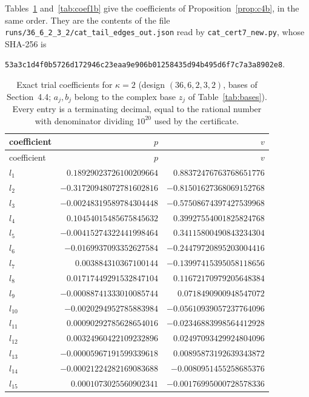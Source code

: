 \documentclass[11pt]{article}
\theoremstyle{definition}
\begin{document}
\clearpage
Tables~\ref{tab:coef2b} and~\ref{tab:coef1b} give the coefficients of Proposition~\ref{prop:c4b}, in the same order. They are the contents of the file \texttt{runs/36\_6\_2\_3\_2/cat\_tail\_edges\_out.json} read by \texttt{cat\_cert7\_new.py}, whose SHA-256 is
\begin{center}\texttt{53a3c1d4f0b5726d172946c23eaa9e906b01258435d94b495d6f7c7a3a8902e8}.\end{center}

{\small
\begin{longtable}{lrr}
\caption{Exact trial coefficients for $\kappa=2$ (design $(36,6,2,3,2)$, bases of Section~4.4; $a_j,b_j$ belong to the complex base $z_j$ of Table~\ref{tab:bases}). Every entry is a terminating decimal, equal to the rational number with denominator dividing $10^{20}$ used by the certificate.}\label{tab:coef2b}\\
\toprule coefficient & $p$ & $v$\\\midrule\endfirsthead
\toprule coefficient & $p$ & $v$\\\midrule\endhead
$l_{1}$ & $0.18929023726100209664$ & $0.88372476763768651776$\\
$l_{2}$ & $-0.31720948072781602816$ & $-0.81501627368069152768$\\
$l_{3}$ & $-0.00248319589784304448$ & $-0.57508674397427539968$\\
$l_{4}$ & $0.10454015485675845632$ & $0.39927554001825824768$\\
$l_{5}$ & $-0.00415274322441998464$ & $0.34115800490843234304$\\
$l_{6}$ & $-0.0169937093352627584$ & $-0.24479720895203004416$\\
$l_{7}$ & $0.003884310367100144$ & $-0.13997415395058118656$\\
$l_{8}$ & $0.01717449291532847104$ & $0.11672170979205648384$\\
$l_{9}$ & $-0.00088741333010085744$ & $0.0718490900948547072$\\
$l_{10}$ & $-0.0020294952785883984$ & $-0.05610939057237764096$\\
$l_{11}$ & $0.00090292785628654016$ & $-0.02346883998564412928$\\
$l_{12}$ & $0.00324960422109232896$ & $0.02497093429924804096$\\
$l_{13}$ & $-0.00005967191599339618$ & $0.00895873192639343872$\\
$l_{14}$ & $-0.00021224282169083688$ & $-0.0080951455258685376$\\
$l_{15}$ & $0.0001073025560902341$ & $-0.00176995000728578336$\\

\end{longtable}}
\end{document}
